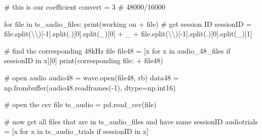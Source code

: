 \documentclass[
  letterpaper,
  DIV=11,
  numbers=noendperiod]{scrreprt}
\newenvironment{Shaded}{\begin{snugshade}}{\end{snugshade}}
\newcommand{\BuiltInTok}[1]{\textcolor[rgb]{0.00,0.23,0.31}{#1}}
\newcommand{\CharTok}[1]{\textcolor[rgb]{0.13,0.47,0.30}{#1}}
\newcommand{\CommentTok}[1]{\textcolor[rgb]{0.37,0.37,0.37}{#1}}
\newcommand{\ControlFlowTok}[1]{\textcolor[rgb]{0.00,0.23,0.31}{#1}}
\newcommand{\DecValTok}[1]{\textcolor[rgb]{0.68,0.00,0.00}{#1}}
\newcommand{\KeywordTok}[1]{\textcolor[rgb]{0.00,0.23,0.31}{#1}}
\newcommand{\NormalTok}[1]{\textcolor[rgb]{0.00,0.23,0.31}{#1}}
\newcommand{\OperatorTok}[1]{\textcolor[rgb]{0.37,0.37,0.37}{#1}}
\newcommand{\StringTok}[1]{\textcolor[rgb]{0.13,0.47,0.30}{#1}}
\begin{document}
\begin{Shaded}
\begin{Highlighting}[]
\CommentTok{\# this is our coefficient}
\NormalTok{convert }\OperatorTok{=} \DecValTok{3} \CommentTok{\# 48000/16000}

\ControlFlowTok{for} \BuiltInTok{file} \KeywordTok{in}\NormalTok{ ts\_audio\_files:}
    \BuiltInTok{print}\NormalTok{(}\StringTok{\textquotesingle{}working on\textquotesingle{}} \OperatorTok{+} \BuiltInTok{file}\NormalTok{)}
    \CommentTok{\# get session ID}
\NormalTok{    sessionID }\OperatorTok{=} \BuiltInTok{file}\NormalTok{.split(}\StringTok{\textquotesingle{}}\CharTok{\textbackslash{}\textbackslash{}}\StringTok{\textquotesingle{}}\NormalTok{)[}\OperatorTok{{-}}\DecValTok{1}\NormalTok{].split(}\StringTok{\textquotesingle{}.\textquotesingle{}}\NormalTok{)[}\DecValTok{0}\NormalTok{].split(}\StringTok{\textquotesingle{}\_\textquotesingle{}}\NormalTok{)[}\DecValTok{0}\NormalTok{] }\OperatorTok{+} \StringTok{\textquotesingle{}\_\textquotesingle{}} \OperatorTok{+} \BuiltInTok{file}\NormalTok{.split(}\StringTok{\textquotesingle{}}\CharTok{\textbackslash{}\textbackslash{}}\StringTok{\textquotesingle{}}\NormalTok{)[}\OperatorTok{{-}}\DecValTok{1}\NormalTok{].split(}\StringTok{\textquotesingle{}.\textquotesingle{}}\NormalTok{)[}\DecValTok{0}\NormalTok{].split(}\StringTok{\textquotesingle{}\_\textquotesingle{}}\NormalTok{)[}\DecValTok{1}\NormalTok{]}

    \CommentTok{\# find the corresponding 48kHz file}
\NormalTok{    file48 }\OperatorTok{=}\NormalTok{ [x }\ControlFlowTok{for}\NormalTok{ x }\KeywordTok{in}\NormalTok{ audio\_48\_files }\ControlFlowTok{if}\NormalTok{ sessionID }\KeywordTok{in}\NormalTok{ x][}\DecValTok{0}\NormalTok{]}
    \BuiltInTok{print}\NormalTok{(}\StringTok{\textquotesingle{}corresponding file: \textquotesingle{}} \OperatorTok{+}\NormalTok{ file48)}

    \CommentTok{\# open audio}
\NormalTok{    audio48 }\OperatorTok{=}\NormalTok{ wave.}\BuiltInTok{open}\NormalTok{(file48, }\StringTok{\textquotesingle{}rb\textquotesingle{}}\NormalTok{)}
\NormalTok{    data48 }\OperatorTok{=}\NormalTok{ np.frombuffer(audio48.readframes(}\OperatorTok{{-}}\DecValTok{1}\NormalTok{), dtype}\OperatorTok{=}\NormalTok{np.int16)}

    \CommentTok{\# open the csv file}
\NormalTok{    ts\_audio }\OperatorTok{=}\NormalTok{ pd.read\_csv(}\BuiltInTok{file}\NormalTok{)}

    \CommentTok{\# now get all files that are in ts\_audio\_files and have same sessionID}
\NormalTok{    audiotrials }\OperatorTok{=}\NormalTok{ [x }\ControlFlowTok{for}\NormalTok{ x }\KeywordTok{in}\NormalTok{ ts\_audio\_trials }\ControlFlowTok{if}\NormalTok{ sessionID }\KeywordTok{in}\NormalTok{ x]}


\end{Highlighting}
\end{Shaded}
\end{document}
